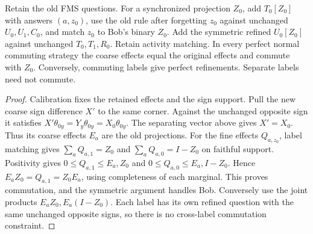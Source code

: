 \begin{lemma}\label{lem:refine}
Retain the old FMS questions. For a synchronized projection $Z_0$, add
$T_0[Z_0]$ with answers $(a,z_0)$, use the old rule after forgetting
$z_0$ against unchanged $U_0,U_1,C_0$, and match $z_0$ to Bob's
binary $Z_0$. Add the symmetric refined $U_0[Z_0]$ against unchanged
$T_0,T_1,R_0$. Retain activity matching.
In every perfect normal commuting strategy the coarse effects equal
the original effects and commute with $Z_0$. Conversely, commuting
labels give perfect refinements. Separate labels need not commute.
\end{lemma}
\begin{proof}
Calibration fixes the retained effects and the sign support.
Pull the new coarse sign difference $X'$ to the same corner.
Against the unchanged opposite sign it satisfies
$X'\theta_{0y}=Y_y\theta_{0y}=X_0\theta_{0y}$.
The separating vector above gives $X'=X_0$.
Thus its coarse effects $E_a$ are the old projections.
For the fine effects $Q_{a,z_0}$, label matching gives
$\sum_aQ_{a,1}=Z_0$ and $\sum_aQ_{a,0}=I-Z_0$ on faithful support.
Positivity gives $0\leq Q_{a,1}\leq E_a,Z_0$ and
$0\leq Q_{a,0}\leq E_a,I-Z_0$.
Hence $E_aZ_0=Q_{a,1}=Z_0E_a$, using completeness of each marginal.
This proves commutation, and the symmetric argument handles Bob.
Conversely use the joint products $E_aZ_0,E_a(I-Z_0)$.
Each label has its own refined question with the same unchanged
opposite signs, so there is no cross-label commutation constraint.
\end{proof}

